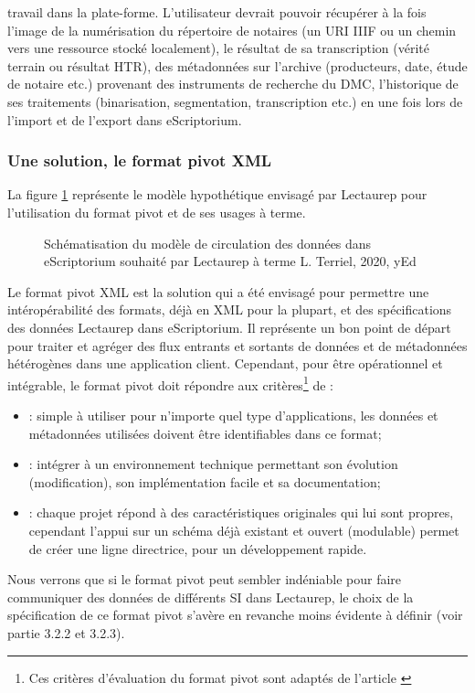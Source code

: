 travail dans la plate-forme. L'utilisateur devrait pouvoir récupérer à la fois l'image de la numérisation du répertoire de notaires (un URI IIIF ou un chemin vers une ressource stocké localement), le résultat de sa transcription (vérité terrain ou résultat HTR), des métadonnées sur l'archive (producteurs, date, étude de notaire etc.) provenant des instruments de recherche du DMC, l'historique de ses traitements (binarisation, segmentation, transcription etc.) en une fois lors de l'import et de l'export dans eScriptorium.    

\subsubsection{Une solution, le format pivot XML}

La figure \ref{fig:modèle_métadonnées_vise_V4} représente le modèle hypothétique envisagé par Lectaurep pour l'utilisation du format pivot et de ses usages à terme. 
\begin{figure}[h]
    \centering
    \centerline{}
    \caption{Schématisation du modèle de circulation des données dans eScriptorium souhaité par Lectaurep à terme  \textcopyright L. Terriel, 2020, yEd}
    \label{fig:modèle_métadonnées_vise_V4}
\end{figure}
\bigskip
Le format pivot XML est la solution qui a été envisagé pour permettre une intéropérabilité des formats, déjà en XML pour la plupart, et des spécifications des données Lectaurep dans eScriptorium. Il représente un bon point de départ pour traiter et agréger des flux entrants et sortants de données et de métadonnées hétérogènes dans une application client. Cependant, pour être opérationnel et intégrable, le format pivot doit répondre aux critères\footnote{Ces critères d'évaluation du format pivot sont adaptés de l'article \cite{stephane_standardisation_2006}} de : 
\begin{itemize}
    \item {} : simple à utiliser pour n'importe quel type d'applications, les données et métadonnées utilisées doivent être identifiables dans ce format;
    \item {} : intégrer à un environnement technique permettant son évolution (modification), son implémentation facile et sa documentation;
    \item {} : chaque projet répond à des caractéristiques originales qui lui sont propres, cependant l'appui sur un schéma déjà existant et ouvert (modulable) permet de créer une ligne directrice, pour un développement rapide.
\end{itemize}
Nous verrons que si le format pivot peut sembler indéniable pour faire communiquer des données de différents SI dans Lectaurep, le choix de la spécification de ce format pivot s'avère en revanche moins évidente à définir (voir partie 3.2.2 et 3.2.3). 

